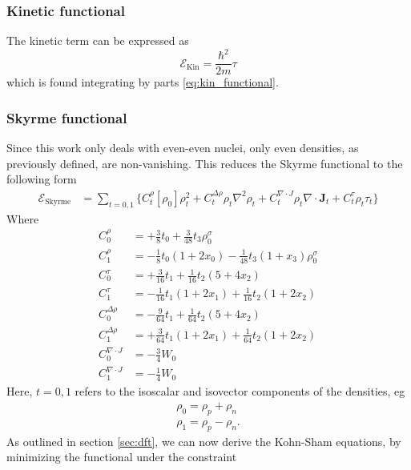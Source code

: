 \subsubsection{Kinetic functional}
The kinetic term can be expressed as
\begin{equation}
    \label{eq:kinfunc}
    \mathcal E_\text{Kin} = \frac{\hbar^2}{2m}\tau
\end{equation}
which is found integrating by parts \eqref{eq:kin_functional}.
\subsubsection{Skyrme functional}
Since this work only deals with even-even nuclei, only even densities, as previously defined, are non-vanishing. This reduces the Skyrme functional to the following form \cite{stevenson2019low}
\begin{align}
    \mathcal E_\text{Skyrme} &= \sum_{t=0,1}\bigg\{C_t^\rho [\rho_0]\rho_t^2+C_t^{\Delta \rho}\rho_t\nabla^2\rho_t+C_t^{\nabla\cdot J}\rho_t\nabla\cdot \mathbf J_t + C_t^\tau\rho_t\tau_t\bigg\}\label{eq:skfunc}
\end{align}
Where
\begin{align}
    C_0^\rho &= +\frac 3 8 t_0 + \frac 3 {48} t_3\rho_0^\sigma \label{eq:C0rho}
    \\C_1^\rho &= -\frac 1 8 t_0(1+2x_0)- \frac 1 {48} t_3(1+x_3)\rho_0^\sigma \label{eq:C1rho}
    \\C_0^\tau &= +\frac 3 {16} t_1 + \frac 1 {16} t_2 (5+4x_2) \label{eq:C0tau}
    \\C_1^\tau &= -\frac 1 {16} t_1(1+2x_1)+\frac 1 {16}t_2(1+2x_2) \label{eq:C1tau}
    \\C_0^{\Delta \rho} &= -\frac 9 {64}t_1+\frac 1 {64}t_2(5+4x_2) \label{eq:C0Deltarho}
    \\C_1^{\Delta \rho} &= +\frac 3 {64}t_1(1+2x_1)+\frac 1 {64}t_2(1+2x_2) \label{eq:C1Deltarho}
    \\C_0^{\nabla\cdot J} &= -\frac 3 4 W_0 \label{eq:C0nabladotJ}
    \\C_1^{\nabla\cdot J} &= -\frac 1 4 W_0 \label{eq:C1nabladotJ}
\end{align}
Here, $t=0,1$ refers to the isoscalar and isovector components of the densities, eg
\begin{align*}
    \rho_0 = \rho_p + \rho_n
    \\\rho_1 = \rho_p - \rho_n.
\end{align*}
As outlined in section \ref{sec:dft}, we can now derive the Kohn-Sham equations, by minimizing the functional under the constraint
